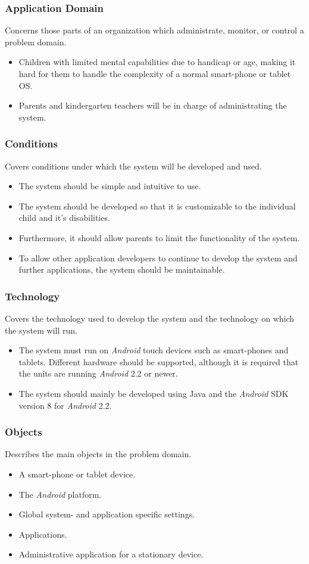 \subsubsection{Application Domain} 
Concerns those parts of an organization which administrate, monitor, or control a
problem domain.
\begin{itemize}
	\item Children with limited mental capabilities due to handicap or age, making it hard for them to handle the complexity of a normal smart-phone or tablet OS. 
	\item Parents and kindergarten teachers will be in charge of administrating the system.
\end{itemize}

\subsubsection{Conditions} 
Covers conditions under which the system will be developed and used.
\begin{itemize}
	\item The system should be simple and intuitive to use. 
	\item The system should be developed so that it is customizable to the individual child and it's disabilities.
	\item Furthermore, it should allow parents to limit the functionality of the system. 
	\item To allow other application developers to continue to develop the system and further applications, the system should be maintainable.
\end{itemize}

\subsubsection{Technology} 
Covers the technology used to develop the system and the technology on which the system will
run.
\begin{itemize}
	\item The system must run on \textit{Android} touch devices such as smart-phones and tablets. Different hardware should be supported, although it is required that the units are running \textit{Android} 2.2 or newer. 
	\item The system should mainly be developed using Java and the \textit{Android} SDK version 8 for \textit{Android} 2.2.
\end{itemize}

\subsubsection{Objects} 
Describes the main objects in the problem domain.
\begin{itemize}
	\item A smart-phone or tablet device. 
	\item The \textit{Android} platform. 
	\item Global system- and application specific settings. 
	\item Applications.
	\item Administrative application for a stationary device.
\end{itemize}

